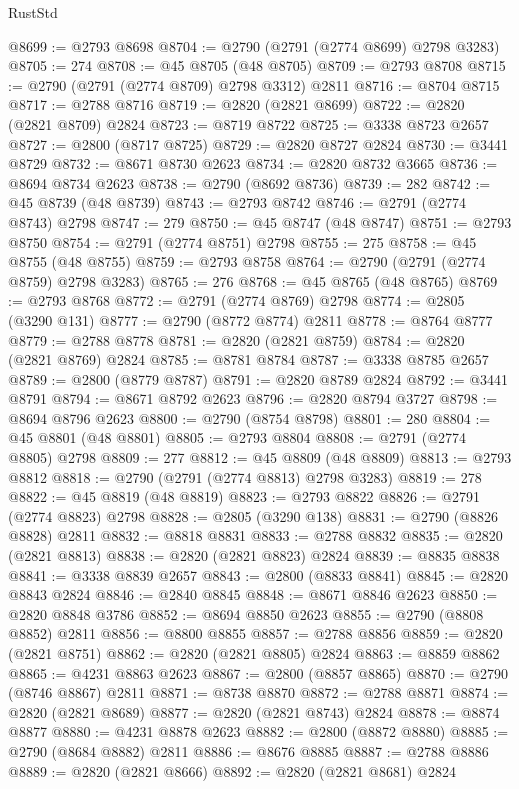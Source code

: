 \begin{lexlean}{RustStd}
\begin{coremodule}
@8699 := @2793 @8698
@8704 := @2790 (@2791 (@2774 @8699) @2798 @3283)
@8705 := 274
@8708 := @45 @8705 (@48 @8705)
@8709 := @2793 @8708
@8715 := @2790 (@2791 (@2774 @8709) @2798 @3312) @2811
@8716 := @8704 @8715
@8717 := @2788 @8716
@8719 := @2820 (@2821 @8699)
@8722 := @2820 (@2821 @8709) @2824
@8723 := @8719 @8722
@8725 := @3338 @8723 @2657
@8727 := @2800 (@8717 @8725)
@8729 := @2820 @8727 @2824
@8730 := @3441 @8729
@8732 := @8671 @8730 @2623
@8734 := @2820 @8732 @3665
@8736 := @8694 @8734 @2623
@8738 := @2790 (@8692 @8736)
@8739 := 282
@8742 := @45 @8739 (@48 @8739)
@8743 := @2793 @8742
@8746 := @2791 (@2774 @8743) @2798
@8747 := 279
@8750 := @45 @8747 (@48 @8747)
@8751 := @2793 @8750
@8754 := @2791 (@2774 @8751) @2798
@8755 := 275
@8758 := @45 @8755 (@48 @8755)
@8759 := @2793 @8758
@8764 := @2790 (@2791 (@2774 @8759) @2798 @3283)
@8765 := 276
@8768 := @45 @8765 (@48 @8765)
@8769 := @2793 @8768
@8772 := @2791 (@2774 @8769) @2798
@8774 := @2805 (@3290 @131)
@8777 := @2790 (@8772 @8774) @2811
@8778 := @8764 @8777
@8779 := @2788 @8778
@8781 := @2820 (@2821 @8759)
@8784 := @2820 (@2821 @8769) @2824
@8785 := @8781 @8784
@8787 := @3338 @8785 @2657
@8789 := @2800 (@8779 @8787)
@8791 := @2820 @8789 @2824
@8792 := @3441 @8791
@8794 := @8671 @8792 @2623
@8796 := @2820 @8794 @3727
@8798 := @8694 @8796 @2623
@8800 := @2790 (@8754 @8798)
@8801 := 280
@8804 := @45 @8801 (@48 @8801)
@8805 := @2793 @8804
@8808 := @2791 (@2774 @8805) @2798
@8809 := 277
@8812 := @45 @8809 (@48 @8809)
@8813 := @2793 @8812
@8818 := @2790 (@2791 (@2774 @8813) @2798 @3283)
@8819 := 278
@8822 := @45 @8819 (@48 @8819)
@8823 := @2793 @8822
@8826 := @2791 (@2774 @8823) @2798
@8828 := @2805 (@3290 @138)
@8831 := @2790 (@8826 @8828) @2811
@8832 := @8818 @8831
@8833 := @2788 @8832
@8835 := @2820 (@2821 @8813)
@8838 := @2820 (@2821 @8823) @2824
@8839 := @8835 @8838
@8841 := @3338 @8839 @2657
@8843 := @2800 (@8833 @8841)
@8845 := @2820 @8843 @2824
@8846 := @2840 @8845
@8848 := @8671 @8846 @2623
@8850 := @2820 @8848 @3786
@8852 := @8694 @8850 @2623
@8855 := @2790 (@8808 @8852) @2811
@8856 := @8800 @8855
@8857 := @2788 @8856
@8859 := @2820 (@2821 @8751)
@8862 := @2820 (@2821 @8805) @2824
@8863 := @8859 @8862
@8865 := @4231 @8863 @2623
@8867 := @2800 (@8857 @8865)
@8870 := @2790 (@8746 @8867) @2811
@8871 := @8738 @8870
@8872 := @2788 @8871
@8874 := @2820 (@2821 @8689)
@8877 := @2820 (@2821 @8743) @2824
@8878 := @8874 @8877
@8880 := @4231 @8878 @2623
@8882 := @2800 (@8872 @8880)
@8885 := @2790 (@8684 @8882) @2811
@8886 := @8676 @8885
@8887 := @2788 @8886
@8889 := @2820 (@2821 @8666)
@8892 := @2820 (@2821 @8681) @2824

\end{coremodule}
\end{lexlean}
